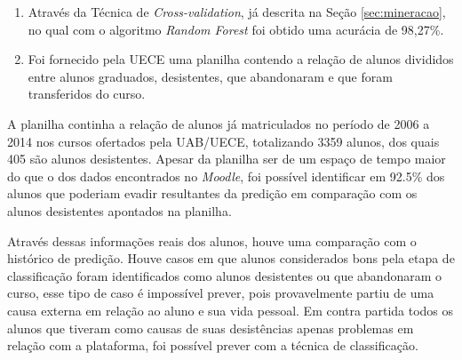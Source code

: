 \begin{enumerate}
\item Através da Técnica de \textit{Cross-validation}, já descrita na Seção \ref{sec:mineracao}, no qual com o algoritmo \textit{Random Forest} foi obtido uma acurácia de 98,27\%.
\item Foi fornecido pela UECE uma planilha contendo a relação de alunos divididos entre alunos graduados, desistentes, que abandonaram e que foram transferidos do curso.
\end{enumerate}

A planilha continha a relação de alunos já matriculados no período de 2006 a 2014 nos cursos ofertados pela UAB/UECE, totalizando 3359 alunos, dos quais 405 são alunos desistentes. Apesar da planilha ser de um espaço de tempo maior do que o dos dados encontrados no \textit{Moodle}, foi possível identificar em 92.5\% dos alunos que poderiam evadir resultantes da predição em comparação com os alunos desistentes apontados na planilha.

Através dessas informações reais dos alunos, houve uma comparação com o histórico de predição. Houve casos em que alunos considerados bons pela etapa de classificação foram identificados como alunos desistentes ou que abandonaram o curso, esse tipo de caso é impossível prever, pois provavelmente partiu de uma causa externa em relação ao aluno e sua vida pessoal. Em contra partida todos os alunos que tiveram como causas de suas desistências apenas problemas em relação com a plataforma, foi possível prever com a técnica de classificação.